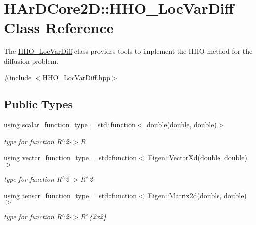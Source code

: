 \hypertarget{classHArDCore2D_1_1HHO__LocVarDiff}{}\section{H\+Ar\+D\+Core2D\+:\+:H\+H\+O\+\_\+\+Loc\+Var\+Diff Class Reference}
\label{classHArDCore2D_1_1HHO__LocVarDiff}


The \hyperlink{classHArDCore2D_1_1HHO__LocVarDiff}{H\+H\+O\+\_\+\+Loc\+Var\+Diff} class provides tools to implement the H\+HO method for the diffusion problem.  




{\ttfamily \#include $<$H\+H\+O\+\_\+\+Loc\+Var\+Diff.\+hpp$>$}

\subsection*{Public Types}
\begin{DoxyCompactItemize}
\item 
\mbox{\label{classHArDCore2D_1_1HHO__LocVarDiff_a8b00c073fd089f8c5a642f8dab63f2a3}} 
using \hyperlink{classHArDCore2D_1_1HHO__LocVarDiff_a8b00c073fd089f8c5a642f8dab63f2a3}{scalar\+\_\+function\+\_\+type} = std\+::function$<$ double(double, double)$>$
\begin{DoxyCompactList}\small\item\em type for function R$^\wedge$2-\/$>$R \end{DoxyCompactList}\item 
\mbox{\label{classHArDCore2D_1_1HHO__LocVarDiff_a9951a7b7866719b71956c455f1e3d937}} 
using \hyperlink{classHArDCore2D_1_1HHO__LocVarDiff_a9951a7b7866719b71956c455f1e3d937}{vector\+\_\+function\+\_\+type} = std\+::function$<$ Eigen\+::\+Vector\+Xd(double, double)$>$
\begin{DoxyCompactList}\small\item\em type for function R$^\wedge$2-\/$>$R$^\wedge$2 \end{DoxyCompactList}\item 
\mbox{\label{classHArDCore2D_1_1HHO__LocVarDiff_a65b5cbf39a759b6ce3b097536f32f5cb}} 
using \hyperlink{classHArDCore2D_1_1HHO__LocVarDiff_a65b5cbf39a759b6ce3b097536f32f5cb}{tensor\+\_\+function\+\_\+type} = std\+::function$<$ Eigen\+::\+Matrix2d(double, double)$>$
\begin{DoxyCompactList}\small\item\em type for function R$^\wedge$2-\/$>$R$^\wedge$\{2x2\} \end{DoxyCompactList}\end{DoxyCompactItemize}

